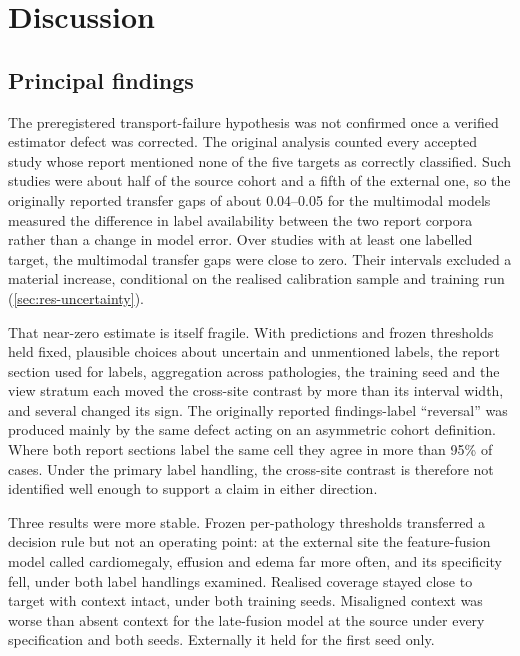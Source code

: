 \section{Discussion}
\label{sec:discussion}

\subsection{Principal findings}
The preregistered transport-failure hypothesis was not confirmed once a
verified estimator defect was corrected. The original analysis counted every
accepted study whose report mentioned none of the five targets as correctly
classified. Such studies were about half of the source cohort and a fifth of
the external one, so the originally reported transfer gaps of about 0.04--0.05 for the
multimodal models measured the difference in label availability between the two
report corpora rather than a change in model error. Over studies with at least
one labelled target, the multimodal transfer gaps were close to zero. Their
intervals excluded a material increase, conditional on the realised calibration
sample and training run (\cref{sec:res-uncertainty}).

That near-zero estimate is itself fragile. With predictions and frozen
thresholds held fixed, plausible choices about uncertain and unmentioned
labels, the report section used for labels, aggregation across pathologies, the
training seed and the view stratum each moved the cross-site contrast by more
than its interval width, and several changed its sign. The originally reported
findings-label ``reversal'' was produced mainly by the same defect acting on an
asymmetric cohort definition. Where both report sections label the same cell
they agree in more than 95\% of cases. Under the primary label handling, the
cross-site contrast is therefore not identified well enough to support a claim
in either direction.

Three results were more stable. Frozen per-pathology thresholds transferred a
decision rule but not an operating point: at the external site the feature-fusion
model called cardiomegaly, effusion and edema far more often, and its
specificity fell, under both label handlings examined. Realised coverage stayed
close to target with context intact, under both training seeds. Misaligned
context was worse than absent context for the late-fusion model at the source
under every specification and both seeds. Externally it held for the first seed
only.


